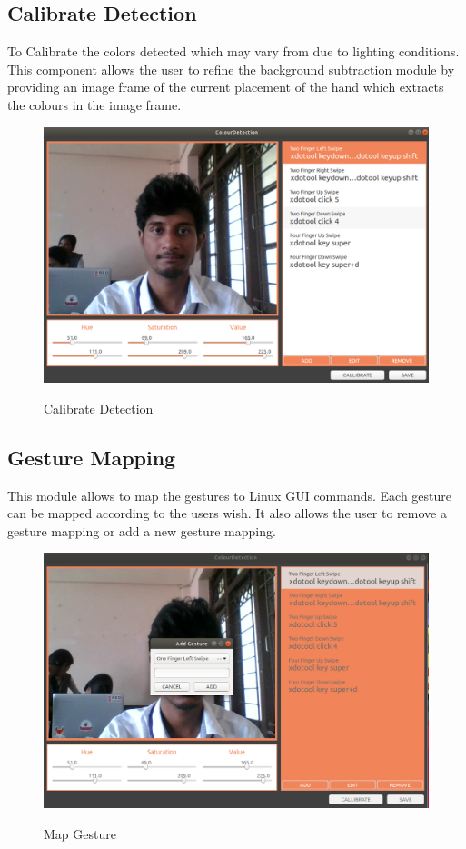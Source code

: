 \documentclass[11pt]{report}
\begin{document}
\subsection{Calibrate Detection}
    To Calibrate the colors detected which may vary from due to lighting conditions. This component allows
    the user to refine the background subtraction module by providing an image frame of the current placement of the hand which
    extracts the colours in the image frame.
    \begin{figure}[H]
    \includegraphics[width=14cm]{1.png}
    \label{Calibrate Detection}
    \caption{Calibrate Detection}
    \end{figure}
\subsection{Gesture Mapping}

    This module allows to map the gestures to Linux GUI commands. Each gesture can be mapped according to 
    the users wish. It also allows the user to remove a gesture mapping or add a new gesture mapping.
    \begin{figure}[H]
        \includegraphics[width=14cm]{2.png}
        \label{Map Gesture}
        \caption{Map Gesture}
        \end{figure}
\end{document}
